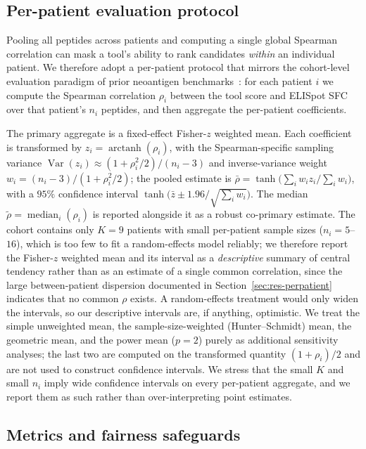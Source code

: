 \subsection{Per-patient evaluation protocol}
\label{sec:perpatient}

Pooling all peptides across patients and computing a single global Spearman
correlation can mask a tool's ability to rank candidates \emph{within} an
individual patient. We therefore adopt a per-patient protocol that mirrors the
cohort-level evaluation paradigm of prior neoantigen
benchmarks~\cite{TESLA2020,Muller2023}: for each patient $i$ we compute the
Spearman correlation $\rho_i$ between the tool score and ELISpot SFC over that
patient's $n_i$ peptides, and then aggregate the per-patient coefficients.

The primary aggregate is a fixed-effect Fisher-$z$ weighted mean. Each
coefficient is transformed by $z_i = \operatorname{arctanh}(\rho_i)$, with the
Spearman-specific sampling variance
$\operatorname{Var}(z_i) \approx (1+\rho_i^2/2)/(n_i-3)$ and inverse-variance
weight $w_i = (n_i-3)/(1+\rho_i^2/2)$; the pooled estimate is
$\bar{\rho} = \tanh\!\big(\sum_i w_i z_i / \sum_i w_i\big)$, with a $95\%$
confidence interval $\tanh\!\big(\bar{z} \pm 1.96/\sqrt{\sum_i w_i}\big)$. The
median $\tilde{\rho} = \operatorname{median}_i(\rho_i)$ is reported alongside it
as a robust co-primary estimate. The cohort contains only $K=9$ patients with
small per-patient sample sizes ($n_i = 5$--$16$), which is too few to fit a
random-effects model reliably; we therefore report the Fisher-$z$ weighted mean
and its interval as a \emph{descriptive} summary of central tendency rather than
as an estimate of a single common correlation, since the large between-patient
dispersion documented in Section~\ref{sec:res-perpatient} indicates that no common
$\rho$ exists. A random-effects treatment would only widen the intervals, so our
descriptive intervals are, if anything, optimistic. We treat the simple
unweighted mean, the sample-size-weighted (Hunter--Schmidt) mean, the geometric
mean, and the power mean ($p=2$) purely as additional sensitivity analyses; the
last two are computed on the transformed quantity $(1+\rho_i)/2$ and are not used
to construct confidence intervals. We stress that the small $K$ and small $n_i$
imply wide confidence intervals on every per-patient aggregate, and we report
them as such rather than over-interpreting point estimates.

\subsection{Metrics and fairness safeguards}
\label{sec:metrics}

